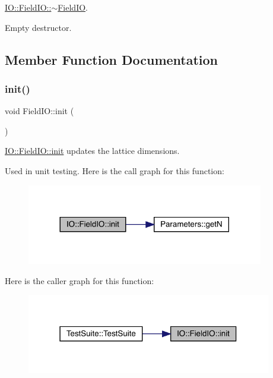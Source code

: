 \mbox{\hyperlink{class_i_o_1_1_field_i_o_ae11a6e9e9a57b6f0f56718b82774af19}{I\+O\+::\+Field\+I\+O\+::$\sim$\+Field\+IO}}. 

Empty destructor. 

\subsection{Member Function Documentation}
\mbox{\label{class_i_o_1_1_field_i_o_a9093930584128c73a63fe8015bff9b38}} 
\subsubsection{\texorpdfstring{init()}{init()}}
{\footnotesize\ttfamily void Field\+I\+O\+::init (\begin{DoxyParamCaption}{ }\end{DoxyParamCaption})\hspace{0.3cm}{\ttfamily [static]}}



\mbox{\hyperlink{class_i_o_1_1_field_i_o_a9093930584128c73a63fe8015bff9b38}{I\+O\+::\+Field\+I\+O\+::init}} updates the lattice dimensions. 

Used in unit testing. Here is the call graph for this function\+:\nopagebreak
\begin{figure}[H]
\begin{center}
\leavevmode
\includegraphics[width=293pt]{class_i_o_1_1_field_i_o_a9093930584128c73a63fe8015bff9b38_cgraph}
\end{center}
\end{figure}
Here is the caller graph for this function\+:\nopagebreak
\begin{figure}[H]
\begin{center}
\leavevmode
\includegraphics[width=303pt]{class_i_o_1_1_field_i_o_a9093930584128c73a63fe8015bff9b38_icgraph}
\end{center}
\end{figure}
\mbox{\label{class_i_o_1_1_field_i_o_af23fb6e02a6bd1cafd5be4acacbf848e}} 
